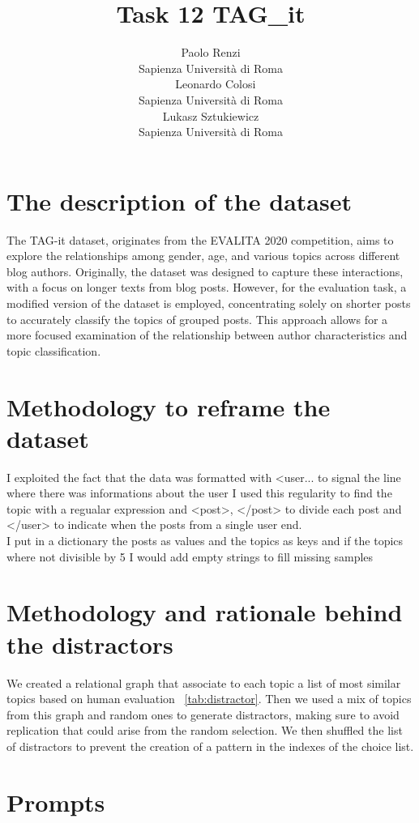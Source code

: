 \documentclass[11pt]{article}
\title{Task 12 TAG\_it}
\author{Paolo Renzi \\
  Sapienza Università di Roma\\\
  \And
  Leonardo Colosi \\
  Sapienza Università di Roma\\
  \And
  Lukasz Sztukiewicz \\
  Sapienza Università di Roma \\
  }
\begin{document}
\maketitle

\section{The description of the dataset}

The TAG-it dataset, originates from the EVALITA 2020 competition, aims to explore the relationships among gender, 
age, and various topics across different blog authors. Originally, the dataset was designed to capture these interactions, 
with a focus on longer texts from blog posts. However, for the evaluation task, a modified version of the dataset 
is employed, concentrating solely on shorter posts to accurately classify the topics of grouped posts. 
This approach allows for a more focused examination of the relationship between author characteristics and topic 
classification.


\section{Methodology to reframe the dataset}

I exploited the fact that the data was formatted with <user... to signal the line where there was informations 
about the user I used this regularity to find the topic with a regualar expression and <post>, </post> to divide 
each post and </user> to indicate when the posts from a single user end. \\
I put in a dictionary the posts as values and the topics as keys and if the topics where not divisible by 5 I would 
add empty strings to fill missing samples 

\section{Methodology and rationale behind the distractors}

We created a relational graph that associate to each topic a list of most similar topics based on human evaluation ~\ref{tab:distractor}. 
Then we used a mix of topics from this graph and random ones to generate distractors, making sure to avoid replication 
that could arise from the random selection. We then shuffled the list of distractors to prevent the creation of a pattern 
in the indexes of the choice list.

\section{Prompts}
\end{document}
